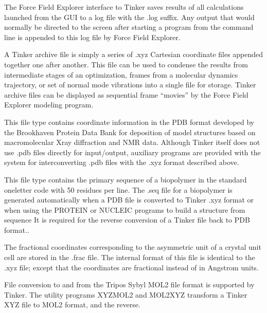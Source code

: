 \documentclass[letterpaper,11pt,english]{sphinxmanual}
\begin{document}

The Force Field Explorer interface to Tinker saves results of all calculations launched from the GUI to a log file with the .log suffix. Any output that would normally be directed to the screen after starting a program from the command line is appended to this log file by Force Field Explorer.


A Tinker archive file is simply a series of .xyz Cartesian coordinate files appended together one after another. This file can be used to condense the results from intermediate stages of an optimization, frames from a molecular dynamics trajectory, or set of normal mode vibrations into a single file for storage. Tinker archive files can be displayed as sequential frame “movies” by the Force Field Explorer modeling program.


This file type contains coordinate information in the PDB format developed by the Brookhaven Protein Data Bank for deposition of model structures based on macromolecular X\sphinxhyphen{}ray diffraction and NMR data. Although Tinker itself does not use .pdb files directly for input/output, auxiliary programs are provided with the system for interconverting .pdb files with the .xyz format described above.


This file type contains the primary sequence of a biopolymer in the standard one\sphinxhyphen{}letter code with 50 residues per line. The .seq file for a biopolymer is generated automatically when a PDB file is converted to Tinker .xyz format or when using the PROTEIN or NUCLEIC programs to build a structure from sequence It is required for the reverse conversion of a Tinker file back to PDB format..


The fractional coordinates corresponding to the asymmetric unit of a crystal unit cell are stored in the .frac file. The internal format of this file is identical to the .xyz file; except that the coordinates are fractional instead of in Angstrom units.


File conversion to and from the Tripos Sybyl MOL2 file format is supported by Tinker. The utility programs XYZMOL2 and MOL2XYZ transform a Tinker XYZ file to MOL2 format, and the reverse.
\end{document}
